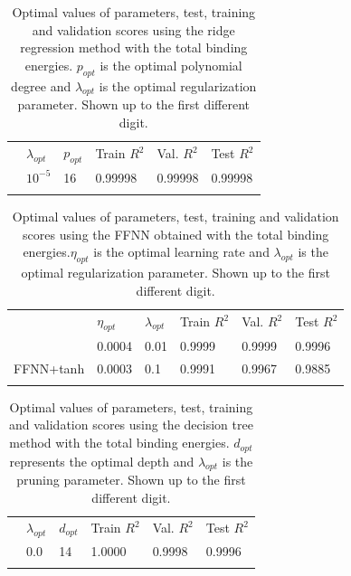 \documentclass[numberedappendix, twocolappendix]{emulateapj}
\begin{document}
\begin{table}[!htb]
\begin{center}
\caption{Optimal values of parameters, test, training and validation scores using the ridge regression method with the total binding energies. $p_{opt}$ is the optimal polynomial degree and $\lambda_{opt}$ is the optimal regularization parameter. Shown up to the first different digit.}
\label{tab: ridge article}  
\begin{tabular}{llllll}
\cline{2-6}\noalign{\smallskip}\cline{2-6}\noalign{\smallskip} 
& $\lambda_{opt}$ & $p_{opt}$ & Train $R^2$ & Val. $R^2$ & Test $R^2$ \\ \noalign{\smallskip}\hline\noalign{\smallskip} \hline\noalign{\smallskip}
\multicolumn{1}{l|}{Ridge} & $10^{-5}$ & 16 & 0.99998 & 0.99998 & 0.99998\\
\noalign{\smallskip}\hline
\end{tabular}
\end{center}
\end{table}

\begin{table}[!htb]
\begin{center}
\caption{Optimal values of parameters, test, training and validation scores using the FFNN obtained with the total binding energies.$\eta_{opt}$ is the optimal learning rate and $\lambda_{opt}$ is the optimal regularization parameter. Shown up to the first different digit.}
\label{tab:FFNN article}  
\begin{tabular}{llllll}
\cline{2-6}\noalign{\smallskip}\cline{2-6}\noalign{\smallskip} 
& $\eta_{opt}$ & $\lambda_{opt}$ &  Train $R^2$ & Val. $R^2$ & Test $R^2$ \\ \noalign{\smallskip}\hline\noalign{\smallskip}
\hline\noalign{\smallskip}
\multicolumn{1}{l|}{FFNN+sigmoid} & 0.0004 & 0.01 & 0.9999 & 0.9999 & 0.9996\\
\multicolumn{1}{l|}{FFNN+tanh} & 0.0003 & 0.1 & 0.9991 & 0.9967 & 0.9885\\
\noalign{\smallskip}\hline
\end{tabular}
\end{center}
\end{table}


\begin{table}[!htb]
\begin{center}
\caption{Optimal values of parameters, test, training and validation scores using the decision tree method with the total binding energies. $d_{opt}$ represents the optimal depth and $\lambda_{opt}$ is the pruning parameter. Shown up to the first different digit.}
\label{tab: DT article}
\begin{tabular}{llllll}
\cline{2-6}\noalign{\smallskip}\cline{2-6}\noalign{\smallskip} 
& $\lambda_{opt}$ & $d_{opt}$ & Train $R^2$ & Val. $R^2$ & Test $R^2$ \\ \noalign{\smallskip}\hline\noalign{\smallskip} \hline\noalign{\smallskip}
\multicolumn{1}{l|}{Decision Tree} & 0.0 & 14 & 1.0000 & 0.9998 & 0.9996\\
\noalign{\smallskip}\hline
\end{tabular}
\end{center}
\end{table}
\end{document}
